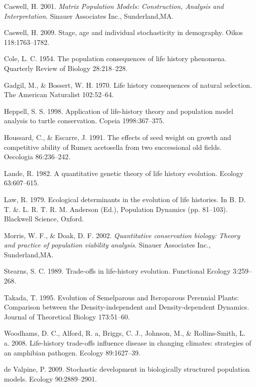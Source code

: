 \documentclass[]{article}
\begin{document}
Caswell, H. 2001. \emph{Matrix Population Models: Construction, Analysis
and Interpretation}. Sinauer Associates Inc., Sunderland,MA.

Caswell, H. 2009. Stage, age and individual stochasticity in demography.
Oikos 118:1763--1782.

Cole, L. C. 1954. The population consequences of life history phenomena.
Quarterly Review of Biology 28:218--228.

Gadgil, M., \& Bossert, W. H. 1970. Life history consequences of natural
selection. The American Naturalist 102:52--64.

Heppell, S. S. 1998. Application of life-history theory and population
model analysis to turtle conservation. Copeia 1998:367--375.

Houssard, C., \& Escarre, J. 1991. The effects of seed weight on growth
and competitive ability of Rumex acetosella from two successional old
fields. Oecologia 86:236--242.

Lande, R. 1982. A quantitative genetic theory of life history evolution.
Ecology 63:607--615.

Law, R. 1979. Ecological determinants in the evolution of life
histories. In B. D. T. \&. L. R. T. R. M. Anderson (Ed.), Population
Dynamics (pp. 81--103). Blackwell Science, Oxford.

Morris, W. F., \& Doak, D. F. 2002. \emph{Quantitative conservation
biology: Theory and practice of population viability analysis}. Sinauer
Associates Inc., Sunderland,MA.

Stearns, S. C. 1989. Trade-offs in life-history evolution. Functional
Ecology 3:259--268.

Takada, T. 1995. Evolution of Semelparous and Iteroparous Perennial
Plants: Comparison between the Density-independent and Density-dependent
Dynamics. Journal of Theoretical Biology 173:51--60.

Woodhams, D. C., Alford, R. a, Briggs, C. J., Johnson, M., \&
Rollins-Smith, L. a. 2008. Life-history trade-offs influence disease in
changing climates: strategies of an amphibian pathogen. Ecology
89:1627--39.

de Valpine, P. 2009. Stochastic development in biologically structured
population models. Ecology 90:2889--2901.
\end{document}
